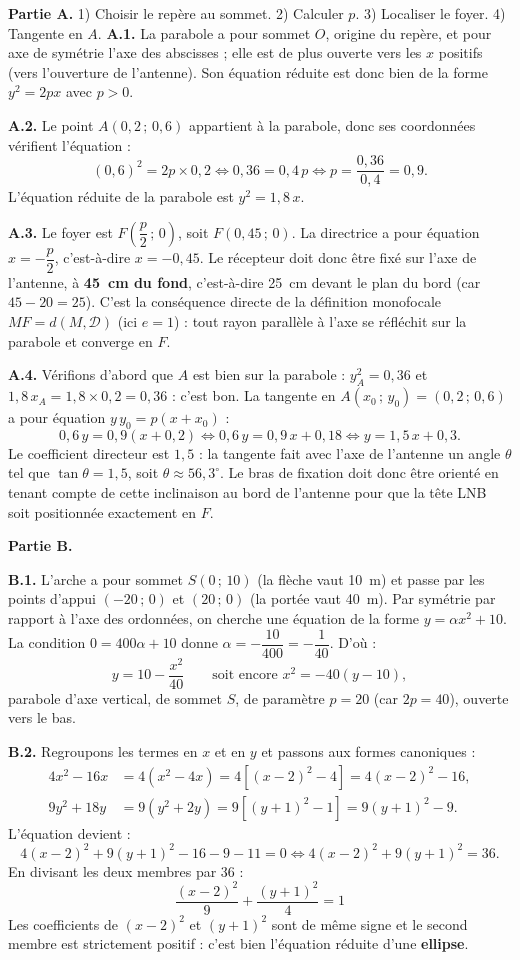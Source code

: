 \documentclass[11pt]{article}
\begin{document}
\begin{exoresolu}
\textbf{Partie A.} 1) Choisir le repère au sommet. 2) Calculer $p$. 3) Localiser le foyer. 4) Tangente en $A$.
\tcblower
\textbf{A.1.} La parabole a pour sommet $O$, origine du repère, et pour axe de symétrie l'axe des abscisses ; elle est de plus ouverte vers les $x$ positifs (vers l'ouverture de l'antenne). Son équation réduite est donc bien de la forme $y^2=2px$ avec $p>0$.

\textbf{A.2.} Le point $A(0,2\,;\,0,6)$ appartient à la parabole, donc ses coordonnées vérifient l'équation :
\[ (0,6)^2=2p\times 0,2 \iff 0,36=0,4\,p \iff p=\frac{0,36}{0,4}=0,9. \]
L'équation réduite de la parabole est $\boxed{y^2=1,8\,x}$.

\textbf{A.3.} Le foyer est $F\left(\dfrac{p}{2}\,;\,0\right)$, soit $F(0,45\,;\,0)$. La directrice a pour équation $x=-\dfrac{p}{2}$, c'est-à-dire $x=-0,45$. Le récepteur doit donc être fixé sur l'axe de l'antenne, à \textbf{\SI{45}{cm} du fond}, c'est-à-dire \SI{25}{cm} devant le plan du bord (car $45-20=25$). C'est la conséquence directe de la définition monofocale $MF=d(M,\mathcal{D})$ (ici $e=1$) : tout rayon parallèle à l'axe se réfléchit sur la parabole et converge en $F$.

\textbf{A.4.} Vérifions d'abord que $A$ est bien sur la parabole : $y_A^2=0,36$ et $1,8\,x_A=1,8\times 0,2=0,36$ : c'est bon. La tangente en $A(x_0\,;\,y_0)=(0,2\,;\,0,6)$ a pour équation $y\,y_0=p(x+x_0)$ :
\[ 0,6\,y=0,9(x+0,2) \iff 0,6\,y=0,9\,x+0,18 \iff y=1,5\,x+0,3. \]
Le coefficient directeur est $1,5$ : la tangente fait avec l'axe de l'antenne un angle $\theta$ tel que $\tan\theta=1,5$, soit $\theta\approx 56,3^{\circ}$. Le bras de fixation doit donc être orienté en tenant compte de cette inclinaison au bord de l'antenne pour que la tête LNB soit positionnée exactement en $F$.

\medskip
\textbf{Partie B.}

\textbf{B.1.} L'arche a pour sommet $S(0\,;\,10)$ (la flèche vaut \SI{10}{m}) et passe par les points d'appui $(-20\,;\,0)$ et $(20\,;\,0)$ (la portée vaut \SI{40}{m}). Par symétrie par rapport à l'axe des ordonnées, on cherche une équation de la forme $y=\alpha x^2+10$. La condition $0=400\alpha+10$ donne $\alpha=-\dfrac{10}{400}=-\dfrac{1}{40}$. D'où :
\[ \boxed{y=10-\frac{x^2}{40}} \qquad\text{soit encore } x^2=-40(y-10), \]
parabole d'axe vertical, de sommet $S$, de paramètre $p=20$ (car $2p=40$), ouverte vers le bas.

\textbf{B.2.} Regroupons les termes en $x$ et en $y$ et passons aux formes canoniques :
\begin{align*}
4x^2-16x &= 4\left(x^2-4x\right)=4\left[(x-2)^2-4\right]=4(x-2)^2-16,\\
9y^2+18y &= 9\left(y^2+2y\right)=9\left[(y+1)^2-1\right]=9(y+1)^2-9.
\end{align*}
L'équation devient :
\[ 4(x-2)^2+9(y+1)^2-16-9-11=0 \iff 4(x-2)^2+9(y+1)^2=36. \]
En divisant les deux membres par $36$ :
\[ \boxed{\frac{(x-2)^2}{9}+\frac{(y+1)^2}{4}=1} \]
Les coefficients de $(x-2)^2$ et $(y+1)^2$ sont de même signe et le second membre est strictement positif : c'est bien l'équation réduite d'une \textbf{ellipse}.


\end{exoresolu}
\end{document}
